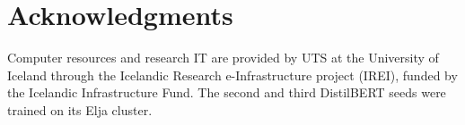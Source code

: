 \section*{Acknowledgments}
Computer resources and research IT are provided by UTS at the University of Iceland through the Icelandic Research
e-Infrastructure project (IREI), funded by the Icelandic Infrastructure Fund. The second and third DistilBERT seeds
were trained on its Elja cluster.
